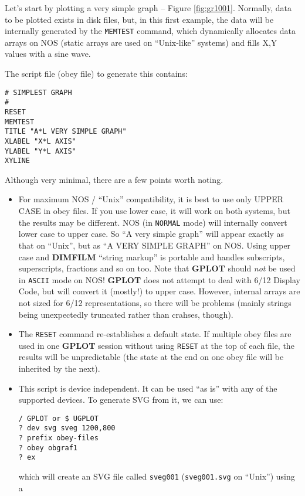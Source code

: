 \documentclass[a4paper,twoside,11pt]{article}
\newcommand{\newpara}{\par\vspace{4mm}\noindent}
\begin{document}
Let's start by plotting a very simple graph -- Figure \ref{fig:gr1001}.
Normally, data to be
plotted exists in disk files, but, in this first example, the data
will be internally generated by the \texttt{MEMTEST} command, which dynamically
allocates data arrays on NOS (static arrays are used on ``Unix-like'' systems)
and fills X,Y values with a sine wave.

\newpara
The script file (obey file) to generate this contains:
\begin{lstlisting}
# SIMPLEST GRAPH
#
RESET
MEMTEST
TITLE "A*L VERY SIMPLE GRAPH"
XLABEL "X*L AXIS"
YLABEL "Y*L AXIS"
XYLINE
\end{lstlisting}

\newpara
Although very minimal, there are a few points worth noting.

\begin{itemize}
\item For maximum NOS / ``Unix'' compatibility, it is best to use only UPPER CASE in obey files.
If you use lower case, it will work on both systems, but the results may be different. 
NOS (in \texttt{NORMAL} mode) will internally convert lower case to upper case. 
So ``A very simple graph'' will appear exactly as that on ``Unix'', but as ``A VERY SIMPLE GRAPH'' on NOS. 
Using upper case and \textbf{DIMFILM} ``string markup'' is portable and handles subscripts, superscripts, 
fractions and so on too. Note that \textbf{GPLOT} should \emph{not} be used in \texttt{ASCII} mode on NOS! 
\textbf{GPLOT} does not attempt to deal with 6/12 Display Code, but will convert it (mostly!) to upper case. 
However, internal arrays are not sized for 6/12 representations, so there will be problems 
(mainly strings being unexpectedly truncated rather than crahses, though).
\item The \texttt{RESET} command re-establishes a default state. If multiple obey files are used in one \textbf{GPLOT} session
without using \texttt{RESET} at the top of each file, the results will be unpredictable (the state 
at the end on one obey file will be inherited by the next).
\item This script is device independent. It can be used ``as is'' with any of the supported devices.
To generate SVG from it, we can use:
\begin{lstlisting}
/ GPLOT or $ UGPLOT
? dev svg sveg 1200,800
? prefix obey-files
? obey obgraf1
? ex
\end{lstlisting}
which will create an SVG file called \texttt{sveg001} (\texttt{sveg001.svg} on ``Unix'') using a 

\end{itemize}
\end{document}
